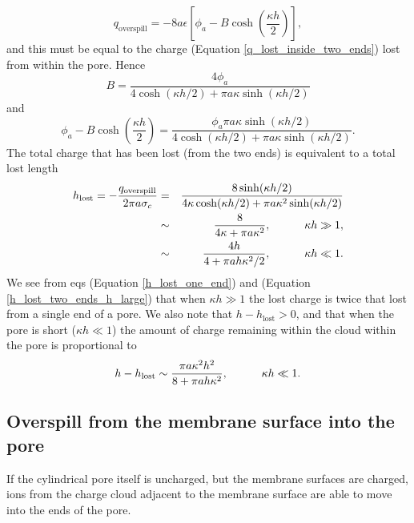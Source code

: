 \begin{equation}
q_\text{overspill}=-8a\epsilon\left\lbrack\phi_a
-B\cosh\left(\frac{\kappa h}{2}\right)\right\rbrack,
\label{q_overspill_two_ends}
\end{equation}
and this must be equal to the charge (Equation \ref{q_lost_inside_two_ends})
lost from within the pore. Hence
\begin{equation}
B=\frac{4\phi_a}{4\cosh(\kappa h/2)+\pi a\kappa\sinh(\kappa h/2)}
\label{B}
\end{equation}
and
\begin{equation}
\phi_a-B\cosh\left(\frac{\kappa h}{2}\right)=
\frac{\phi_a\pi a\kappa\sinh(\kappa h/2)}{4\cosh(\kappa h/2)+\pi
  a\kappa\sinh(\kappa h/2)}.
\label{phi_a_minus_B_cosh}
\end{equation}
The total charge that has been lost (from the two ends) is equivalent to a
total lost length
\begin{eqnarray}
h_\text{lost}=-\frac{q_\text{overspill}}{2\pi a\sigma_c}&=&
\frac{8\sinh(\kappa h/2)}
{4\kappa\cosh(\kappa h/2)+\pi a\kappa^2\sinh(\kappa h/2)}
\label{h_lost_two_ends}
\\
&\sim&\frac{8}{4\kappa+\pi a\kappa^2},\hskip 30pt \kappa h\gg 1,
\label{h_lost_two_ends_h_large}
\\
&\sim&\frac{4h}{4+\pi ah\kappa^2/2}
,\hskip 30pt \kappa h\ll 1.
\label{h_lost_two_ends_h_small}
\end{eqnarray}
We see from eqs (Equation \ref{h_lost_one_end}) and (Equation \ref{h_lost_two_ends_h_large}) 
that when $\kappa h\gg 1$ the lost charge is twice that lost
from a single end of a pore. We also note that $h-h_\text{lost}>0$, and that
when the pore is short ($\kappa h\ll 1$) the amount of charge
remaining within the cloud within the pore is proportional to
\begin{equation}
h-h_\text{lost}
\sim\frac{\pi a \kappa^2h^2}{8+\pi ah\kappa^2}
,\hskip 30pt \kappa h\ll 1.
\label{h_min_h_lost_h_small}
\end{equation}

\subsection{Overspill from the membrane surface into the pore}
\label{subsec:finite_overspill4-3}
If the cylindrical
pore itself is uncharged, but the membrane surfaces are charged, ions
from the charge cloud adjacent to the membrane surface
are able to move into the ends of the pore.

